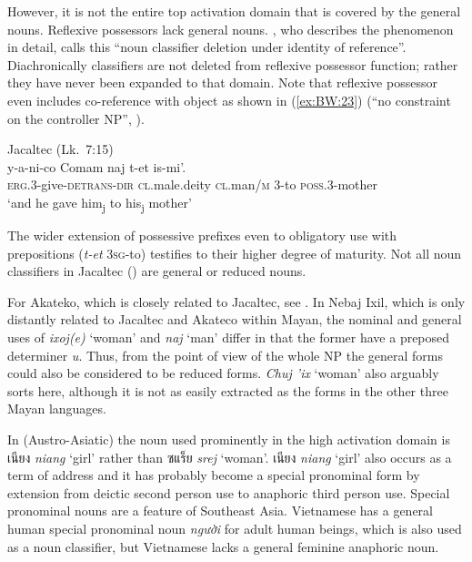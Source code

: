 \documentclass[output=collectionpaper]{langsci/langscibook}
\begin{document}
However, it is not the entire top activation domain that is covered by the general nouns. Reflexive possessors lack general nouns. \citet[159]{Craig1977}, who describes the phenomenon in detail, calls this “noun classifier deletion under identity of reference”. Diachronically classifiers are not deleted from reflexive possessor function; rather they have never been expanded to that domain. Note that reflexive possessor even includes co-reference with object as shown in (\ref{ex:BW:23}) (“no constraint on the controller NP”, \citealt[152]{Craig1977}).

\ea\label{ex:BW:23}
Jacaltec (Lk.~7:15)\\
\gll y-a-ni-co	Comam	naj	t-et	is-mi'.\\
\textsc{erg}.3-give-\textsc{detrans-dir}	\textsc{cl}.male.deity	\textsc{cl}.man/\textsc{m}	3-to	\textsc{poss}.3-mother\\
\glt ‘and he gave him\textsubscript{j} to his\textsubscript{j} mother’\\
\z

The wider extension of possessive prefixes even to obligatory use with prepositions (\textit{t-et} \textsc{3sg}-to) testifies to their higher degree of maturity. Not all noun classifiers in Jacaltec (\citealt[125]{Day1973}) are general or reduced nouns.

For Akateko, which is closely related to Jacaltec, see \citet{Zavala1992}. In Nebaj Ixil, which is only distantly related to Jacaltec and Akateco within Mayan, the nominal and general uses of \textit{ixoj(e)} ‘woman’ and \textit{naj} ‘man’ differ in that the former have a preposed determiner \textit{u}. Thus, from the point of view of the whole NP the general forms could also be considered to be reduced forms. \textit{Chuj 'ix} ‘woman’ also arguably sorts here, although it is not as easily extracted as the forms in the other three Mayan languages.

In  (Austro-Asiatic) the noun used prominently in the high activation domain is \textkhmer{เนียง}  \textit{niang} ‘girl’ rather than \textkhmer{ซแร็ย}  \textit{srej} ‘woman’. \textkhmer{เนียง }\textit{niang} ‘girl’ also occurs as a term of address and it has probably become a special pronominal form by extension from deictic second person use to anaphoric third person use. Special pronominal nouns are a feature of Southeast Asia. Vietnamese has a general human special pronominal noun \textit{người} for adult human beings, which is also used as a noun classifier, but Vietnamese lacks a general feminine anaphoric noun.
\end{document}
